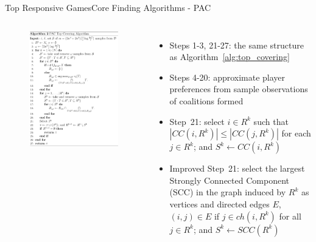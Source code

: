 \documentclass[xcolor=dvipsnames]{beamer}
\newcommand{\ch}{\mathit{ch}}
\newcommand{\CC}{\mathit{CC}}
\newcommand{\SCC}{\mathit{SCC}}
\begin{document}
\begin{frame}{Top Responsive Games}{Core Finding Algorithms - PAC}
  \begin{columns}
  \begin{figure}
    \includegraphics[width=\linewidth]{pac_top_cover}
  \end{figure}
  \begin{itemize}
    \scriptsize
    \item Steps 1-3, 21-27: the same structure as Algorithm~\ref{alg:top_covering}
    \item Steps 4-20: approximate player preferences from sample observations of coalitions formed
    \item \cite{ijcai2017-380} Step~21: select $i\in R^k$ such
                        that $|\CC(i,R^k)| \leq |\CC(j,R^k)|$ for each $j\in R^k$;
                        and $S^k\leftarrow \CC(i,R^k)$
    \item Improved Step~21: select the largest Strongly Connected Component (SCC)
                        in the graph induced by $R^k$ as vertices and directed edges $E$,
                        $(i, j) \in E$ if $j \in \ch(i, R^k)$ for all $j \in R^k$;
                        and $S^k\leftarrow \SCC(R^k)$
  \end{itemize}
  \end{columns}
\end{frame}
\end{document}
